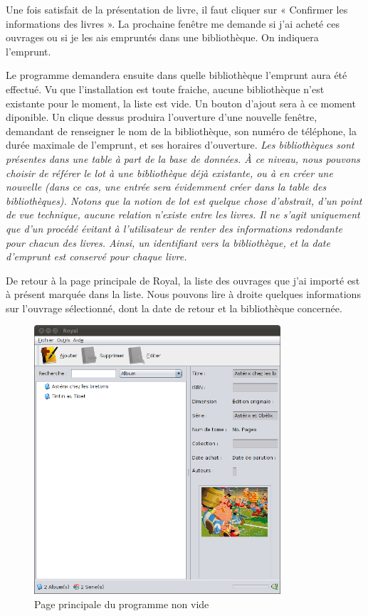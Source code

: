 Une fois satisfait de la présentation de livre, il faut cliquer sur « Confirmer les informations des livres ». 
La prochaine fenêtre me demande si j'ai acheté ces ouvrages ou si je les ais empruntés dans une bibliothèque. 
On indiquera l'emprunt.

Le programme demandera ensuite dans quelle bibliothèque l'emprunt aura été effectué. 
Vu que l'installation est toute fraiche, aucune bibliothèque n'est existante pour le moment, la liste est vide.
Un bouton d'ajout sera à ce moment diponible. 
Un clique dessus produira l'ouverture d'une nouvelle fenêtre, demandant de renseigner le nom de la bibliothèque, son numéro de téléphone, la durée maximale de l'emprunt, et ses horaires d'ouverture. 
\emph{Les bibliothèques sont présentes dans une table à part de la base de données.
	À ce niveau, nous pouvons choisir de référer le lot à une bibliothèque déjà existante, ou à en créer une nouvelle
	(dans ce cas, une entrée sera évidemment créer dans la table des bibliothèques). 
	Notons que la notion de lot est quelque chose d'abstrait, d'un point de vue technique, aucune relation n'existe entre les livres.
	Il ne s'agit uniquement que d'un procédé évitant à l'utilisateur de renter des informations redondante pour chacun des livres.
	Ainsi, un identifiant vers la bibliothèque, et la date d'emprunt est conservé pour chaque livre.
}

De retour à la page principale de Royal, la liste des ouvrages que j'ai importé est à présent marquée dans la liste. 
Nous pouvons lire à droite quelques informations sur l'ouvrage sélectionné, dont la date de retour et la bibliothèque concernée. 

\begin{figure}[h]
\begin{center}
\includegraphics[height=10cm]{../img/principale.png}
\end{center}
\caption{Page principale du programme non vide}
\end{figure}


